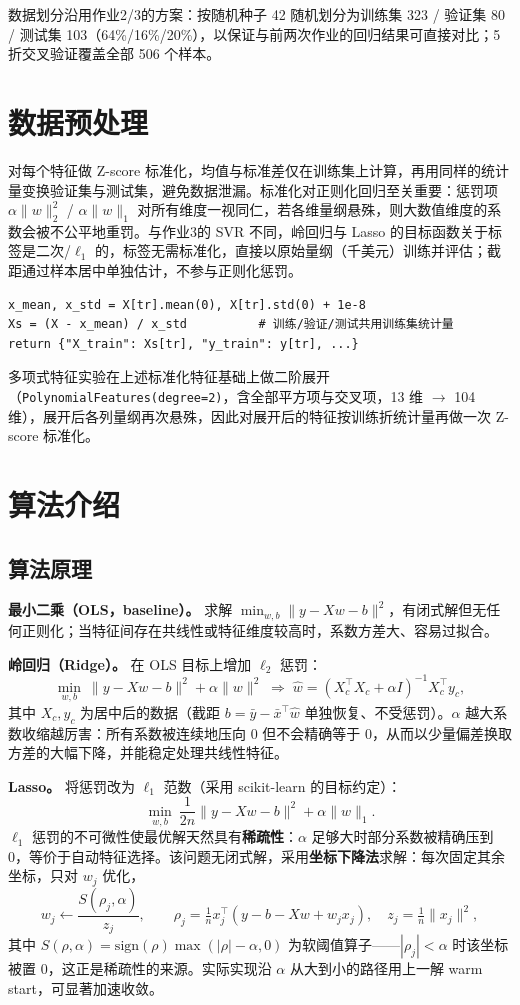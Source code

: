 \documentclass[UTF8,zihao=-4]{ctexart}
\begin{document}
数据划分沿用作业2/3的方案：按随机种子 42 随机划分为训练集 323 / 验证集 80 / 测试集 103（64\%/16\%/20\%），以保证与前两次作业的回归结果可直接对比；5 折交叉验证覆盖全部 506 个样本。

\section{数据预处理}
对每个特征做 Z-score 标准化，均值与标准差仅在训练集上计算，再用同样的统计量变换验证集与测试集，避免数据泄漏。标准化对正则化回归至关重要：惩罚项 $\alpha\|w\|_2^2$ / $\alpha\|w\|_1$ 对所有维度一视同仁，若各维量纲悬殊，则大数值维度的系数会被不公平地重罚。与作业3的 SVR 不同，岭回归与 Lasso 的目标函数关于标签是二次/$\ell_1$ 的，标签无需标准化，直接以原始量纲（千美元）训练并评估；截距通过样本居中单独估计，不参与正则化惩罚。

\begin{lstlisting}
x_mean, x_std = X[tr].mean(0), X[tr].std(0) + 1e-8
Xs = (X - x_mean) / x_std          # 训练/验证/测试共用训练集统计量
return {"X_train": Xs[tr], "y_train": y[tr], ...}
\end{lstlisting}

多项式特征实验在上述标准化特征基础上做二阶展开（\texttt{PolynomialFeatures(degree=2)}，含全部平方项与交叉项，13 维 $\to$ 104 维），展开后各列量纲再次悬殊，因此对展开后的特征按训练折统计量再做一次 Z-score 标准化。

\section{算法介绍}
\subsection{算法原理}
\textbf{最小二乘（OLS，baseline）。} 求解 $\min_{w,b}\|y-Xw-b\|^2$，有闭式解但无任何正则化；当特征间存在共线性或特征维度较高时，系数方差大、容易过拟合。

\textbf{岭回归（Ridge）。} 在 OLS 目标上增加 $\ell_2$ 惩罚：
\[
  \min_{w,b}\ \|y-Xw-b\|^2 + \alpha\|w\|^2
  \;\Longrightarrow\;
  \hat w = (X_c^\top X_c + \alpha I)^{-1}X_c^\top y_c,
\]
其中 $X_c,y_c$ 为居中后的数据（截距 $b=\bar y-\bar x^\top\hat w$ 单独恢复、不受惩罚）。$\alpha$ 越大系数收缩越厉害：所有系数被连续地压向 0 但不会精确等于 0，从而以少量偏差换取方差的大幅下降，并能稳定处理共线性特征。

\textbf{Lasso。} 将惩罚改为 $\ell_1$ 范数（采用 scikit-learn 的目标约定）：
\[
  \min_{w,b}\ \frac{1}{2n}\|y-Xw-b\|^2 + \alpha\|w\|_1 .
\]
$\ell_1$ 惩罚的不可微性使最优解天然具有\textbf{稀疏性}：$\alpha$ 足够大时部分系数被精确压到 0，等价于自动特征选择。该问题无闭式解，采用\textbf{坐标下降法}求解：每次固定其余坐标，只对 $w_j$ 优化，
\[
  w_j \leftarrow \frac{S(\rho_j,\alpha)}{z_j},\qquad
  \rho_j = \tfrac{1}{n}x_j^\top(y-b-Xw+w_jx_j),\quad z_j=\tfrac{1}{n}\|x_j\|^2,
\]
其中 $S(\rho,\alpha)=\mathrm{sign}(\rho)\max(|\rho|-\alpha,0)$ 为软阈值算子——$|\rho_j|<\alpha$ 时该坐标被置 0，这正是稀疏性的来源。实际实现沿 $\alpha$ 从大到小的路径用上一解 warm start，可显著加速收敛。
\end{document}
